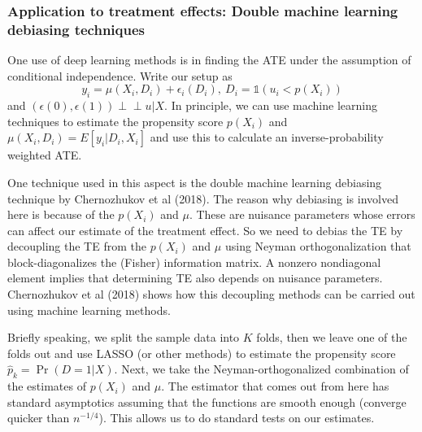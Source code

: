 \documentclass[12pt]{article}
\theoremstyle{definition}
\theoremstyle{property}
\theoremstyle{assumption}
\theoremstyle{example}
\theoremstyle{comment}
\begin{document}
\subsubsection{Application to treatment effects: Double machine learning debiasing techniques}
One use of deep learning methods is in finding the ATE under the assumption of conditional independence. Write our setup as
\[
y_ i = \mu(X_i, D_i)+\epsilon_i(D_i), \ D_i=\mathbb{1}(u_i<p(X_i))
\]
and $(\epsilon(0), \epsilon(1))\perp\!\!\perp u|X$. In principle, we can use machine learning techniques to estimate the propensity score $p(X_i)$ and $\mu(X_i, D_i)=E[y_i|D_i, X_i]$ and use this to calculate an inverse-probability weighted ATE.
\par
One technique used in this aspect is the double machine learning debiasing technique by Chernozhukov et al (2018). The reason why debiasing is involved here is because of the $p(X_i)$ and $\mu$. These are nuisance parameters whose errors can affect our estimate of the treatment effect. So we need to debias the TE by decoupling the TE from the $p(X_i)$ and $\mu$ using Neyman orthogonalization that block-diagonalizes the (Fisher) information matrix. A nonzero nondiagonal element implies that determining TE also depends on nuisance parameters. Chernozhukov et al (2018) shows how this decoupling methods can be carried out using machine learning methods. 
\par
Briefly speaking, we split the sample data into $K$ folds, then we leave one of the folds out and use LASSO (or other methods) to estimate the propensity score $\hat{p}_k=\Pr(D=1|X)$. Next, we take the Neyman-orthogonalized combination of the estimates of $p(X_i)$ and $\mu$. The estimator that comes out from here has standard asymptotics assuming that the functions are smooth enough (converge quicker than $n^{-1/4}$). This allows us to do standard tests on our estimates. 
\end{document}
